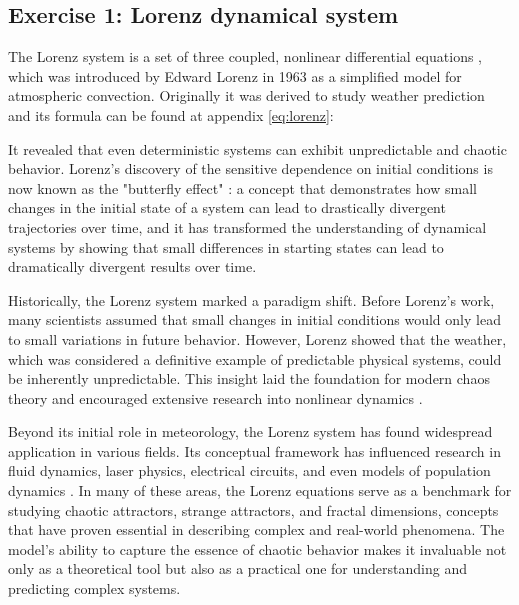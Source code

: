 

\subsection{Exercise 1: Lorenz dynamical system}

The Lorenz system is a set of three coupled, nonlinear differential equations \cite{1963JAtS...20..130L},
 which was introduced by Edward Lorenz in 1963 as a simplified model for atmospheric convection.
  Originally it was derived to study weather prediction and its formula can be found at appendix \ref{eq:lorenz}:

It revealed that even deterministic systems can exhibit unpredictable and chaotic behavior. Lorenz's discovery of the sensitive dependence on initial conditions is now known as the "butterfly effect" \cite{apsLorenz2003}: a concept that demonstrates how small changes in the initial state of a system can lead to drastically divergent trajectories over time, and it has transformed the understanding of dynamical systems by showing that small differences in starting states can lead to dramatically divergent results over time.

Historically, the Lorenz system marked a paradigm shift. Before Lorenz's work, many scientists assumed that small changes in initial conditions would only lead to small variations in future behavior. However, Lorenz showed that the weather, which was considered a definitive example of predictable physical systems, could be inherently unpredictable. This insight laid the foundation for modern chaos theory and encouraged extensive research into nonlinear dynamics \cite{apsLorenz2003}.

Beyond its initial role in meteorology, the Lorenz system has found widespread application in various fields. Its conceptual framework has influenced research in fluid dynamics, laser physics, electrical circuits, and even models of population dynamics \cite{kashyap2024lorenz}. In many of these areas, the Lorenz equations serve as a benchmark for studying chaotic attractors, strange attractors, and fractal dimensions, concepts that have proven essential in describing complex and real-world phenomena. The model’s ability to capture the essence of chaotic behavior makes it invaluable not only as a theoretical tool but also as a practical one for understanding and predicting complex systems.

